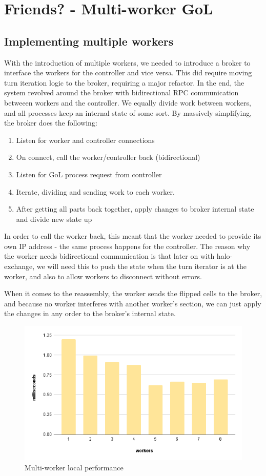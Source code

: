 \documentclass[twoside,twocolumn]{article}
\begin{document}
\section{Friends? - Multi-worker GoL}
\subsection{Implementing multiple workers}
With the introduction of multiple workers, we needed to introduce a broker to interface the workers for the controller
and vice versa. This did require moving turn iteration logic to the broker, requiring a major refactor. In the end, the system
revolved around the broker with bidirectional RPC communication betweeen workers and the controller. We equally divide work
between workers, and all processes keep an internal state of some sort. By massively simplifying, the broker does the following:

\begin{enumerate}[noitemsep]
  \item Listen for worker and controller connections
  \item On connect, call the worker/controller back (bidirectional)
  \item Listen for GoL process request from controller
  \item Iterate, dividing and sending work to each worker.
  \item After getting all parts back together, apply changes to broker internal state and divide new state up
\end{enumerate}
In order to call the worker back, this meant that the worker needed to provide its own IP address - the same 
process happens for the controller. The reason why the worker needs bidirectional communication is that later on with halo-exchange,
we will need this to push the state when the turn iterator is at the worker, and also to allow workers to disconnect 
without errors.

When it comes to the reassembly, the worker sends the flipped cells to the broker, and because no 
worker interferes with another worker's section, we can just apply the changes in any order to the broker's
internal state.
\begin{figure}
  \includegraphics[width=\linewidth]{multi-worker.png}
  \caption{Multi-worker local performance}
  \label{fig:chart6}
\end{figure}
\end{document}
